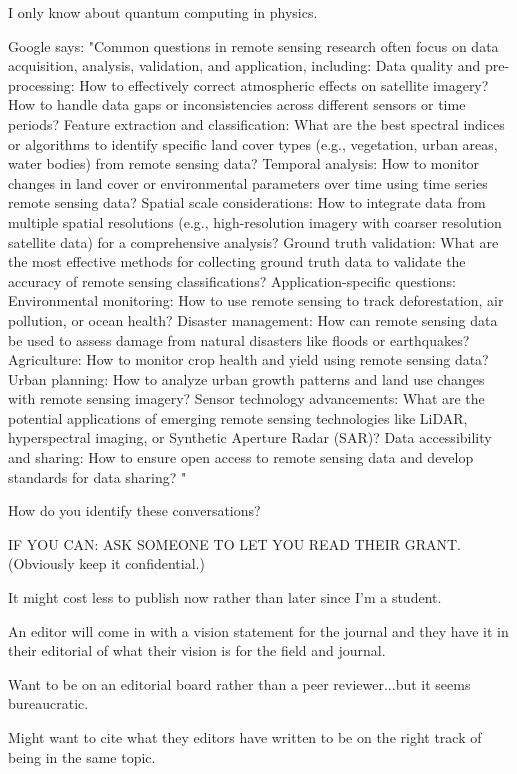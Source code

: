 \documentclass{article}
\begin{document}
I only know about quantum computing in physics. 


Google says:
"Common questions in remote sensing research often focus on data acquisition, analysis, validation, and application, including:
Data quality and pre-processing:
How to effectively correct atmospheric effects on satellite imagery? How to handle data gaps or inconsistencies across different sensors or time periods? 
Feature extraction and classification:
What are the best spectral indices or algorithms to identify specific land cover types (e.g., vegetation, urban areas, water bodies) from remote sensing data? 
Temporal analysis:
How to monitor changes in land cover or environmental parameters over time using time series remote sensing data? 
Spatial scale considerations:
How to integrate data from multiple spatial resolutions (e.g., high-resolution imagery with coarser resolution satellite data) for a comprehensive analysis? 
Ground truth validation:
What are the most effective methods for collecting ground truth data to validate the accuracy of remote sensing classifications? 
Application-specific questions:
Environmental monitoring: How to use remote sensing to track deforestation, air pollution, or ocean health? 
Disaster management: How can remote sensing data be used to assess damage from natural disasters like floods or earthquakes? 
Agriculture: How to monitor crop health and yield using remote sensing data? 
Urban planning: How to analyze urban growth patterns and land use changes with remote sensing imagery? 
Sensor technology advancements:
What are the potential applications of emerging remote sensing technologies like LiDAR, hyperspectral imaging, or Synthetic Aperture Radar (SAR)? 
Data accessibility and sharing:
How to ensure open access to remote sensing data and develop standards for data sharing? "

How do you identify these conversations? 


IF YOU CAN: ASK SOMEONE TO LET YOU READ THEIR GRANT. (Obviously keep it confidential.)


It might cost less to publish now rather than later since I'm a student. 

An editor will come in with a vision statement for the journal and they have it in their editorial of what their vision is for the field and journal. 

Want to be on an editorial board rather than a peer reviewer...but it seems bureaucratic. 

Might want to cite what they editors have written to be on the right track of being in the same topic. 
\end{document}
